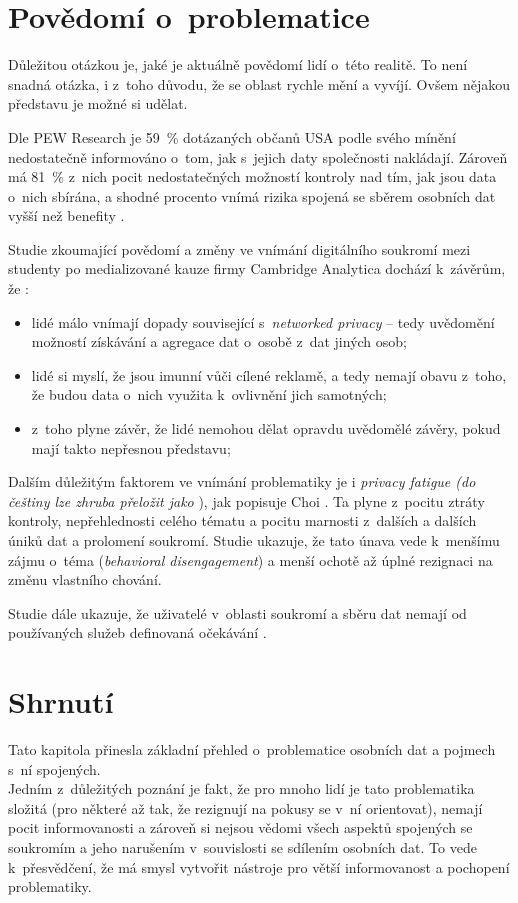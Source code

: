 \section{Povědomí o~problematice}

Důležitou otázkou je, jaké je aktuálně povědomí lidí o~této realitě. To není snadná otázka, i z~toho důvodu, že se oblast rychle mění a vyvíjí. Ovšem nějakou představu je možné si udělat.

Dle PEW Research je 59~\% dotázaných občanů USA podle svého mínění nedostatečně informováno o~tom, jak s~jejich daty společnosti nakládají.
Zároveň má 81~\% z~nich pocit nedostatečných možností kontroly nad tím, jak jsou data o~nich sbírána, a shodné procento vnímá rizika spojená se sběrem osobních dat vyšší než benefity \citep{lack-of-control}.

Studie zkoumající povědomí a změny ve vnímání digitálního soukromí mezi studenty po medializované kauze firmy Cambridge Analytica dochází k~závěrům, že \citep{privacy-awareness}:

\begin{itemize}
	\item lidé málo vnímají dopady související s~\textit{networked privacy} -- tedy uvědomění možností získávání a agregace dat o~osobě z~dat jiných osob;
	\item lidé si myslí, že jsou imunní vůči cílené reklamě, a tedy nemají obavu z~toho, že budou data o~nich využita k~ovlivnění jich samotných;
	\item z~toho plyne závěr, že lidé nemohou dělat opravdu uvědomělé závěry, pokud mají takto nepřesnou představu;
\end{itemize}

Dalším důležitým faktorem ve vnímání problematiky je i \textit{privacy fatigue (do češtiny lze zhruba přeložit jako }), jak popisuje Choi \citep{privacy-fatigue}. Ta plyne z~pocitu ztráty kontroly, nepřehlednosti celého tématu a pocitu marnosti z~dalších a dalších úniků dat a prolomení soukromí. Studie ukazuje, že tato únava vede k~menšímu zájmu o~téma (\textit{behavioral disengagement}) a menší ochotě až úplné rezignaci na změnu vlastního chování.

Studie dále ukazuje, že uživatelé v~oblasti soukromí a sběru dat nemají od používaných služeb definovaná očekávání \citep{user-privacy-expectations}.


\section*{Shrnutí}
Tato kapitola přinesla základní přehled o~problematice osobních dat a pojmech s~ní spojených.\\
Jedním z~důležitých poznání je fakt, že pro mnoho lidí je tato problematika složitá (pro některé až tak, že rezignují na pokusy se v~ní orientovat), nemají pocit informovanosti a zároveň si nejsou vědomi všech aspektů spojených se soukromím a jeho narušením v~souvislosti se sdílením osobních dat. To vede k~přesvědčení, že má smysl vytvořit nástroje pro větší informovanost a pochopení problematiky.